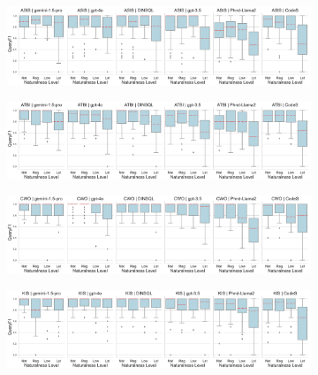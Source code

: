 \begin{figure}
    \centering
    \begin{subfigure}{\textwidth}
      \centering
      \includegraphics[width=\textwidth]{figures/natlevel-boxplots/natlevel-model-f1-boxplot-ASIS.pdf}
    \end{subfigure}
    \begin{subfigure}{\textwidth}
      \centering
      \includegraphics[width=\textwidth]{figures/natlevel-boxplots/natlevel-model-f1-boxplot-ATBI.pdf}
    \end{subfigure}
    \begin{subfigure}{\textwidth}
      \centering
      \includegraphics[width=\textwidth]{figures/natlevel-boxplots/natlevel-model-f1-boxplot-CWO.pdf}
    \end{subfigure}
    \begin{subfigure}{\textwidth}
      \centering
      \includegraphics[width=\textwidth]{figures/natlevel-boxplots/natlevel-model-f1-boxplot-KIS.pdf}
    \end{subfigure}
    \begin{subfigure}{\textwidth}

\end{subfigure}
\end{figure}
